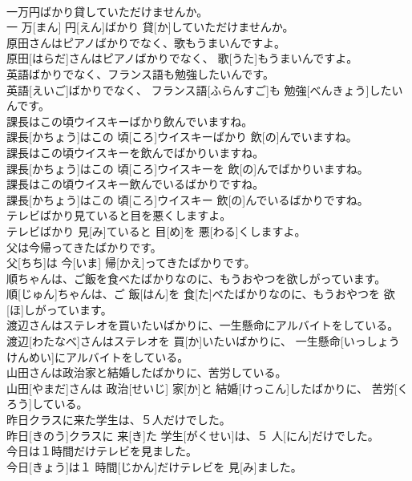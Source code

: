 \documentclass[8pt]{extreport}
\begin{document}
\begin{CJK}{UTF8}{min}
\\	一万円ばかり貸していただけませんか。	
\\	一 万[まん] 円[えん]ばかり 貸[か]していただけませんか。	
\\	原田さんはピアノばかりでなく、歌もうまいんですよ。	
\\	原田[はらだ]さんはピアノばかりでなく、 歌[うた]もうまいんですよ。	
\\	英語ばかりでなく、フランス語も勉強したいんです。	
\\	英語[えいご]ばかりでなく、 フランス語[ふらんすご]も 勉強[べんきょう]したいんです。	
\\	課長はこの頃ウイスキーばかり飲んでいますね。	
\\	課長[かちょう]はこの 頃[ころ]ウイスキーばかり 飲[の]んでいますね。	
\\	課長はこの頃ウイスキーを飲んでばかりいますね。	
\\	課長[かちょう]はこの 頃[ころ]ウイスキーを 飲[の]んでばかりいますね。	
\\	課長はこの頃ウイスキー飲んでいるばかりですね。	
\\	課長[かちょう]はこの 頃[ころ]ウイスキー 飲[の]んでいるばかりですね。	
\\	テレビばかり見ていると目を悪くしますよ。	
\\	テレビばかり 見[み]ていると 目[め]を 悪[わる]くしますよ。	
\\	父は今帰ってきたばかりです。	
\\	父[ちち]は 今[いま] 帰[かえ]ってきたばかりです。	
\\	順ちゃんは、ご飯を食べたばかりなのに、もうおやつを欲しがっています。	
\\	順[じゅん]ちゃんは、ご 飯[はん]を 食[た]べたばかりなのに、もうおやつを 欲[ほ]しがっています。	
\\	渡辺さんはステレオを買いたいばかりに、一生懸命にアルバイトをしている。	
\\	渡辺[わたなべ]さんはステレオを 買[か]いたいばかりに、 一生懸命[いっしょうけんめい]にアルバイトをしている。	
\\	山田さんは政治家と結婚したばかりに、苦労している。	
\\	山田[やまだ]さんは 政治[せいじ] 家[か]と 結婚[けっこん]したばかりに、 苦労[くろう]している。	
\\	昨日クラスに来た学生は、５人だけでした。	
\\	昨日[きのう]クラスに 来[き]た 学生[がくせい]は、５ 人[にん]だけでした。	
\\	今日は１時間だけテレビを見ました。	
\\	今日[きょう]は１ 時間[じかん]だけテレビを 見[み]ました。	

\end{CJK}
\end{document}
